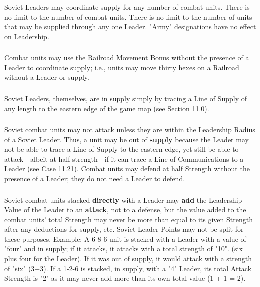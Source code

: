\subsubsection{} Soviet Leaders may coordinate supply for any number of combat units. There is no limit to the number of combat units. There is no limit to the number of units that may be supplied through any one Leader. "Army" designations have no effect on Leadership.

\subsubsection{} Combat units may use the Railroad Movement Bonus without the presence of a Leader to coordinate supply; i.e., units may move thirty hexes on a Railroad without a Leader or supply.

\subsubsection{} Soviet Leaders, themselves, are in supply simply by tracing a Line of Supply of any length to the eastern edge of the game map (see Section 11.0).

\subsubsection{} Soviet combat units may not attack unless they are within the Leadership Radius of a Soviet Leader. Thus, a unit may be out of \textbf{supply} because the Leader may not be able to trace a Line of Supply to the eastern edge, yet still be able to attack - albeit at half-strength - if it can trace a Line of Communications to a Leader (see Case 11.21). Combat units may defend at half Strength without the presence of a Leader; they do not need a Leader to defend.

\subsubsection{} Soviet combat units stacked \textbf{directly} with a Leader may \textbf{add} the Leadership Value of the Leader to an \textbf{attack}, not to a defense, but the value added to the combat units' total Strength may never be more than equal to its given Strength after any deductions for supply, etc. Soviet Leader Points may not be split for these purposes. Example: A 6-8-6 unit is stacked with a Leader with a value of "four" and in supply; if it attacks, it attacks with a total strength of "10". (six plus four for the Leader). If it was out of supply, it would attack with a strength of "six" (3+3). If a 1-2-6 is stacked, in supply, with a "4" Leader, its total Attack Strength is "2" as it may never add more than its own total value (1 + 1 = 2).

